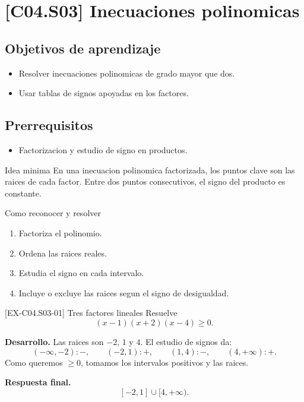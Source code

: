 \section{[C04.S03] Inecuaciones polinomicas}

\subsection*{Objetivos de aprendizaje}
\begin{itemize}
  \item Resolver inecuaciones polinomicas de grado mayor que dos.
  \item Usar tablas de signos apoyadas en los factores.
\end{itemize}

\subsection*{Prerrequisitos}
\begin{itemize}
  \item Factorizacion y estudio de signo en productos.
\end{itemize}

\begin{theorybox}{Idea minima}
En una inecuacion polinomica factorizada, los puntos clave son las raices de cada factor. Entre
dos puntos consecutivos, el signo del producto es constante.
\end{theorybox}

\begin{methodbox}{Como reconocer y resolver}
\begin{enumerate}
  \item Factoriza el polinomio.
  \item Ordena las raices reales.
  \item Estudia el signo en cada intervalo.
  \item Incluye o excluye las raices segun el signo de desigualdad.
\end{enumerate}
\end{methodbox}

\begin{solvedexample}{[EX-C04.S03-01] Tres factores lineales}
Resuelve
\[
(x-1)(x+2)(x-4)\geq 0.
\]

\textbf{Desarrollo.} Las raices son \(-2\), \(1\) y \(4\). El estudio de signos da:
\[
(-\infty,-2): -, \qquad (-2,1): +, \qquad (1,4): -, \qquad (4,+\infty): +.
\]
Como queremos \(\geq 0\), tomamos los intervalos positivos y las raices.

\textbf{Respuesta final.}
\[
[-2,1]\cup [4,+\infty).
\]
\end{solvedexample}

